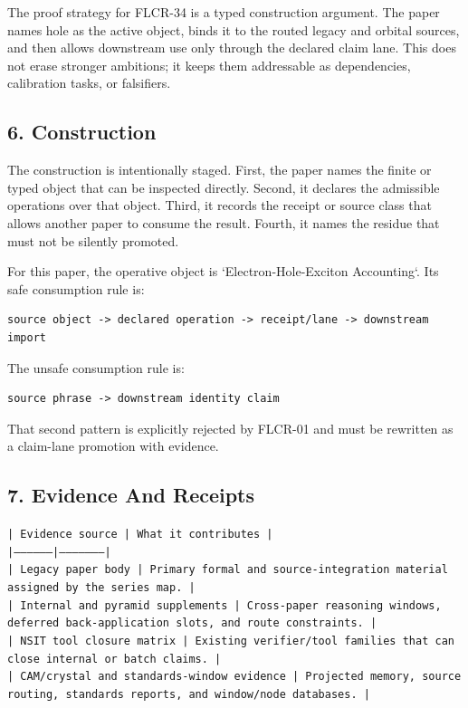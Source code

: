 \documentclass[11pt]{article}
\begin{document}
The proof strategy for FLCR-34 is a typed construction argument. The paper names hole as the active object, binds it to the routed legacy and orbital sources, and then allows downstream use only through the declared claim lane. This does not erase stronger ambitions; it keeps them addressable as dependencies, calibration tasks, or falsifiers.

\subsection*{6. Construction}

The construction is intentionally staged. First, the paper names the finite or
typed object that can be inspected directly. Second, it declares the admissible
operations over that object. Third, it records the receipt or source class that
allows another paper to consume the result. Fourth, it names the residue that
must not be silently promoted.

For this paper, the operative object is `Electron-Hole-Exciton Accounting`. Its safe consumption
rule is:

\begin{verbatim}
source object -> declared operation -> receipt/lane -> downstream import
\end{verbatim}

The unsafe consumption rule is:

\begin{verbatim}
source phrase -> downstream identity claim
\end{verbatim}

That second pattern is explicitly rejected by FLCR-01 and must be rewritten as
a claim-lane promotion with evidence.

\subsection*{7. Evidence And Receipts}

\noindent\texttt{| Evidence source | What it contributes |}\\
\noindent\texttt{|-----------------|---------------------|}\\
\noindent\texttt{| Legacy paper body | Primary formal and source-integration material assigned by the series map. |}\\
\noindent\texttt{| Internal and pyramid supplements | Cross-paper reasoning windows, deferred back-application slots, and route constraints. |}\\
\noindent\texttt{| NSIT tool closure matrix | Existing verifier/tool families that can close internal or batch claims. |}\\
\noindent\texttt{| CAM/crystal and standards-window evidence | Projected memory, source routing, standards reports, and window/node databases. |}\\
\end{document}
